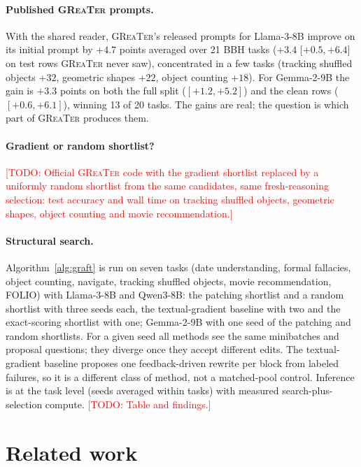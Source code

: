 \documentclass{article}
\newcommand{\greater}{\textsc{GReaTer}}
\newcommand{\todo}[1]{\textcolor{red}{[TODO: #1]}}
\begin{document}
\paragraph{Published \greater{} prompts.} With the shared reader, \greater{}'s released
prompts for Llama-3-8B improve on its initial prompt by $+4.7$ points averaged over 21
BBH tasks ($+3.4$ [$+0.5,+6.4$] on test rows \greater{} never saw), concentrated in a few
tasks (tracking shuffled objects $+32$, geometric shapes $+22$, object counting $+18$).
For Gemma-2-9B the gain is $+3.3$ points on both the full split ($[+1.2,+5.2]$) and
the clean rows ($[+0.6,+6.1]$), winning 13 of 20 tasks. The gains are real; the question
is which part of \greater{} produces them.

\paragraph{Gradient or random shortlist?} \todo{Official \greater{} code with the
gradient shortlist replaced by a uniformly random shortlist from the same candidates,
same fresh-reasoning selection: test accuracy and wall time on tracking shuffled
objects, geometric shapes, object counting and movie recommendation.}

\paragraph{Structural search.} Algorithm~\ref{alg:graft} is run on seven tasks (date
understanding, formal fallacies, object counting, navigate, tracking shuffled objects,
movie recommendation, FOLIO) with Llama-3-8B and Qwen3-8B: the patching shortlist and a
random shortlist with three seeds each, the textual-gradient baseline with two and the
exact-scoring shortlist with one; Gemma-2-9B with one seed of the patching and random
shortlists. For a given seed all methods see the same minibatches and proposal questions;
they diverge once they accept different edits. The textual-gradient baseline proposes
one feedback-driven rewrite per block from labeled failures, so it is a different class
of method, not a matched-pool control. Inference is at the task level (seeds averaged
within tasks) with measured search-plus-selection compute. \todo{Table and findings.}

\section{Related work}
\label{sec:related}
\end{document}
